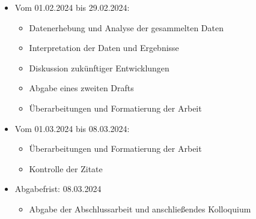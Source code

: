 \begin{itemize}
    \item Vom 01.02.2024 bis 29.02.2024:
    \begin{itemize}
        \item Datenerhebung und Analyse der gesammelten Daten
        \item Interpretation der Daten und Ergebnisse
        \item Diskussion zukünftiger Entwicklungen
        \item Abgabe eines zweiten Drafts
        \item Überarbeitungen und Formatierung der Arbeit
    \end{itemize}

    \item Vom 01.03.2024 bis 08.03.2024:
    \begin{itemize}
        \item Überarbeitungen und Formatierung der Arbeit
        \item Kontrolle der Zitate
    \end{itemize}
    
    \item Abgabefrist: 08.03.2024
    \begin{itemize}
        \item Abgabe der Abschlussarbeit und anschließendes Kolloquium
    \end{itemize}
\end{itemize}